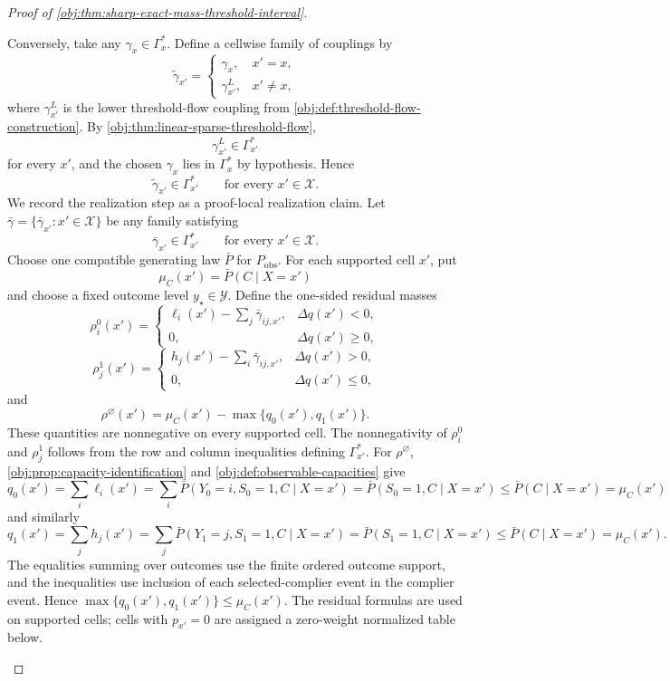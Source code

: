 \begin{proof}[Proof of \cref{obj:thm:sharp-exact-mass-threshold-interval}]
\begin{enumerate}
Conversely, take any \(\gamma_x\in\Gamma_x^\ast\).  Define a cellwise family of couplings by
\[
\widetilde\gamma_{x'}=
\begin{cases}
\gamma_x, & x'=x,\\
\gamma_{x'}^L, & x'\ne x,
\end{cases}
\]
where \(\gamma_{x'}^L\) is the lower threshold-flow coupling from
\cref{obj:def:threshold-flow-construction}.  By
\cref{obj:thm:linear-sparse-threshold-flow},
\[
\gamma_{x'}^L\in\Gamma_{x'}^\ast
\]
for every \(x'\), and the chosen \(\gamma_x\) lies in \(\Gamma_x^\ast\) by hypothesis.  Hence
\[
\widetilde\gamma_{x'}\in\Gamma_{x'}^\ast\qquad\text{for every }x'\in\mathcal X .
\]
We record the realization step as a proof-local realization claim.  Let \(\bar\gamma=\{\bar\gamma_{x'}:x'\in\mathcal X\}\) be any family satisfying
\[
\bar\gamma_{x'}\in\Gamma_{x'}^\ast\qquad\text{for every }x'\in\mathcal X .
\]
Choose one compatible generating law \(\bar P\) for \(P_{\mathrm{obs}}\).  For each supported cell \(x'\), put
\[
\mu_C(x')=\bar P(C\mid X=x')
\]
and choose a fixed outcome level \(y_\star\in\mathcal Y\).  Define the one-sided residual masses
\[
\rho_i^0(x')=
\begin{cases}
\ell_i(x')-\sum_j\bar\gamma_{ij,x'}, & \Delta q(x')<0,\\
0, & \Delta q(x')\ge0,
\end{cases}
\]
\[
\rho_j^1(x')=
\begin{cases}
h_j(x')-\sum_i\bar\gamma_{ij,x'}, & \Delta q(x')>0,\\
0, & \Delta q(x')\le0,
\end{cases}
\]
and
\[
\rho^\varnothing(x')=\mu_C(x')-\max\{q_0(x'),q_1(x')\}.
\]
These quantities are nonnegative on every supported cell.  The nonnegativity of \(\rho_i^0\) and \(\rho_j^1\) follows from the row and column inequalities defining \(\Gamma_{x'}^\ast\).  For \(\rho^\varnothing\), \cref{obj:prop:capacity-identification} and \cref{obj:def:observable-capacities} give
\[
q_0(x')=\sum_i\ell_i(x')
=\sum_i \bar P(Y_0=i,S_0=1,C\mid X=x')
=\bar P(S_0=1,C\mid X=x')
\le \bar P(C\mid X=x')=\mu_C(x')
\]
and similarly
\[
q_1(x')=\sum_j h_j(x')
=\sum_j \bar P(Y_1=j,S_1=1,C\mid X=x')
=\bar P(S_1=1,C\mid X=x')
\le \bar P(C\mid X=x')=\mu_C(x').
\]
The equalities summing over outcomes use the finite ordered outcome support, and the inequalities use inclusion of each selected-complier event in the complier event.  Hence \(\max\{q_0(x'),q_1(x')\}\le\mu_C(x')\).  The residual formulas are used on supported cells; cells with \(p_{x'}=0\) are assigned a zero-weight normalized table below.


\end{enumerate}
\end{proof}
